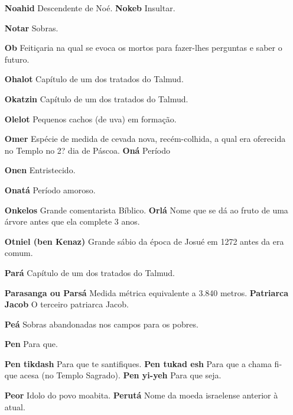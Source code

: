 \begin{itemize}
\item[\textbf{Noahid} Descendente de Noé. \textbf{Nokeb}] Insultar.

\item[\textbf{Notar}] Sobras.

\item[\textbf{Ob}] Feitiçaria na qual se evoca os mor­tos para fazer-lhes
perguntas e saber o futuro.

\item[\textbf{Ohalot}] Capítulo de um dos tratados do Talmud.

\item[\textbf{Okatzin}] Capítulo de um dos tratados do Talmud.

\item[\textbf{Olelot}] Pequenos cachos (de uva) em formação.

\item[\textbf{Omer}] Espécie de medida de cevada nova, recém-colhida, a qual
era ofere­cida no Templo no 2? dia de Páscoa. \textbf{Oná} Período

\item[\textbf{Onen}] Entristecido.

\item[\textbf{Onatá}] Período amoroso.

\item[\textbf{Onkelos} Grande comentarista Bíblico. \textbf{Orlá}] Nome que
se dá ao fruto de uma árvore antes que ela complete 3 anos.
\item[\textbf{Otniel (ben Kenaz)}] Grande sábio da época de Josué em 1272
antes da era comum.

\item[\textbf{Pará}] Capítulo de um dos tratados do Talmud.

\item[\textbf{Parasanga ou Parsá}] Medida métri­ca equivalente a 3.840
metros. \textbf{Patriarca Jacob} O terceiro patriar­ca Jacob.

\item[\textbf{Peá}] Sobras abandonadas nos campos para os pobres.

\item[\textbf{Pen}] Para que.

\item[\textbf{Pen tikdash} Para que te santifiques. \textbf{Pen tukad esh}]
Para que a chama fi­que acesa (no Templo Sagrado). \textbf{Pen yi-yeh}
Para que seja.

\item[\textbf{Peor} Idolo do povo moabita. \textbf{Perutá}] Nome da moeda
israelense anterior à atual.


\end{itemize}

